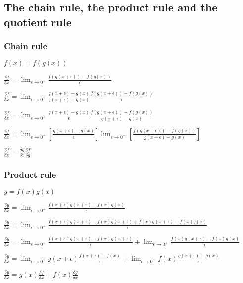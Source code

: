 
\subsection{The chain rule, the product rule and the quotient rule}

\subsubsection{Chain rule}

$f(x)=f(g(x))$

$\frac{\delta f}{\delta x}=\lim_{\epsilon \rightarrow 0^+}\frac{f(g(x+\epsilon) )-f(g(x))}{\epsilon }$

$\frac{\delta f}{\delta x}=\lim_{\epsilon \rightarrow 0^+}\frac{g(x+\epsilon )-g(x)}{g(x+\epsilon )-g(x)}\frac{f(g(x+\epsilon) )-f(g(x))}{\epsilon }$

$\frac{\delta f}{\delta x}=\lim_{\epsilon \rightarrow 0^+}\frac{g(x+\epsilon )-g(x)}{\epsilon }\frac{f(g(x+\epsilon) )-f(g(x))}{g(x+\epsilon )-g(x)}$

$\frac{\delta f}{\delta x}=\lim_{\epsilon \rightarrow 0^+}[\frac{g(x+\epsilon )-g(x)}{\epsilon }]\lim_{\epsilon \rightarrow 0^+}[\frac{f(g(x+\epsilon) )-f(g(x))}{g(x+\epsilon )-g(x)}]$

$\frac{\delta f}{\delta x}=\frac{\delta g}{\delta x}\frac{\delta f}{\delta g}$

\subsubsection{Product rule}

$y=f(x)g(x)$

$\frac{\delta y}{\delta x}=\lim_{\epsilon \rightarrow 0^+}\frac{f(x+\epsilon )g(x+\epsilon )-f(x)g(x)}{\epsilon }$

$\frac{\delta y}{\delta x}=\lim_{\epsilon \rightarrow 0^+}\frac{f(x+\epsilon )g(x+\epsilon )-f(x)g(x+\epsilon )+f(x)g(x+\epsilon )-f(x)g(x)}{\epsilon }$

$\frac{\delta y}{\delta x}=\lim_{\epsilon \rightarrow 0^+}\frac{f(x+\epsilon )g(x+\epsilon )-f(x)g(x+\epsilon )}{\epsilon }+\lim_{\epsilon \rightarrow 0^+}\frac{f(x)g(x+\epsilon )-f(x)g(x)}{\epsilon }$

$\frac{\delta y}{\delta x}=\lim_{\epsilon \rightarrow 0^+}g(x+\epsilon )\frac{f(x+\epsilon )-f(x)}{\epsilon }+\lim_{\epsilon \rightarrow 0^+}f(x)\frac{g(x+\epsilon )-g(x)}{\epsilon }$

$\frac{\delta y}{\delta x}=g(x)\frac{\delta f}{\delta x }+f(x)\frac{\delta g}{\delta x}$

